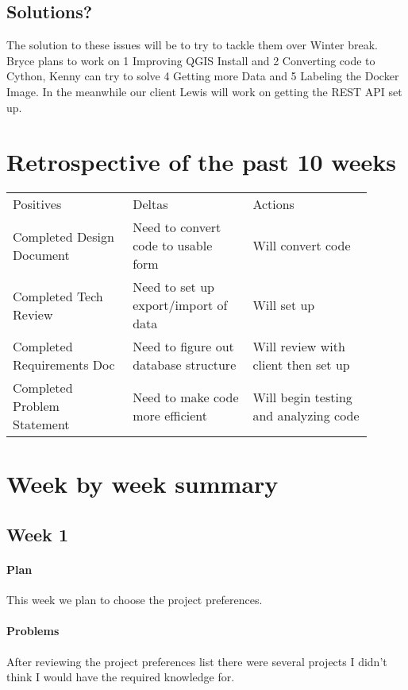 \documentclass[onecolumn, draftclsnofoot,10pt, compsoc]{IEEEtran}
\begin{document}
\subsection{Solutions?}

The solution to these issues will be to try to tackle them over Winter break. Bryce plans to work on 1 Improving QGIS Install and 2 Converting code to Cython, Kenny can try to solve 4 Getting more Data and 5 Labeling the Docker Image. In the meanwhile our client Lewis will work on getting the REST API set up.

\section{Retrospective of the past 10 weeks}

\begin{center}
\begin{tabular}{ p{0.3\linewidth} p{0.3\linewidth} p{0.3\linewidth} }
 Positives & Deltas & Actions \\
 Completed Design Document  & Need to convert code to usable form & Will convert code \\
 Completed Tech Review & Need to set up export/import of data & Will set up \\
 Completed Requirements Doc & Need to figure out database structure & Will review with client then set up \\
 Completed Problem Statement & Need to make code more efficient & Will begin testing and analyzing code
\end{tabular}
\end{center}

\section{Week by week summary}

\subsection{Week 1}

\paragraph{Plan}
This week we plan to choose the project preferences.
\paragraph{Problems}
After reviewing the project preferences list there were several projects I didn't think I would have the required knowledge for.
\end{document}
